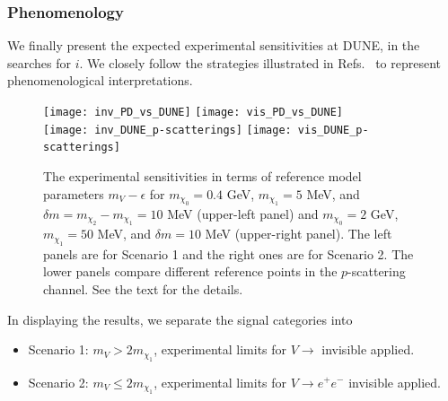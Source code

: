 

\subsubsection{Phenomenology}\label{Sec:Pheno}

We finally present the expected experimental sensitivities at %
DUNE, in the searches for $i$. 
We closely follow the strategies illustrated in Refs.~\cite{Giudice:2017zke, Chatterjee:2018mej, Kim:2018veo} to represent phenomenological interpretations. 

\begin{figure}[t]
\centering
\texttt{[image: inv\_PD\_vs\_DUNE]} 
\texttt{[image: vis\_PD\_vs\_DUNE]} \\
\vspace{0.3cm}
\texttt{[image: inv\_DUNE\_p-scatterings]}
\texttt{[image: vis\_DUNE\_p-scatterings]}
\caption[Experimental sensitivities for $m_{\chi_n}$ values in terms of $m_V - \epsilon$]{
The experimental sensitivities in terms of reference model parameters $m_V - \epsilon$ 
for $m_{\chi_0} = 0.4$ GeV, $m_{\chi_1} = 5$ MeV, and $\delta m = m_{\chi_2} - m_{\chi_1} = 10$ MeV (upper-left panel) and $m_{\chi_0} = 2$ GeV, $m_{\chi_1} = 50$ MeV, and $\delta m = 10$ MeV (upper-right panel).
The left panels are for Scenario 1 and the right ones are for Scenario 2.
The lower panels compare different reference points in the $p$-scattering channel.
See the text for the details.
\label{fig:darkphotonparameter} }
\end{figure}


In displaying the results, we separate the signal categories into %
\begin{itemize}
\item Scenario 1: $m_V > 2 m_{\chi_1}$, experimental limits for $V \to$ invisible  applied.
\item Scenario 2: $m_V \le 2 m_{\chi_1}$, experimental limits for $V \to e^+ e^-$ invisible  applied.
\end{itemize}

